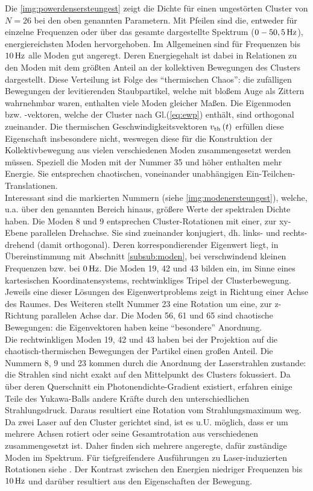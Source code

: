           Die \autoref{img:powerdensersteungest} zeigt die Dichte für einen ungestörten Cluster von $N=26$ bei den oben genannten Parametern. Mit Pfeilen sind die, entweder für einzelne Frequenzen oder über das gesamte dargestellte Spektrum ($\unit[0-50,5]{Hz}$), energiereichsten Moden hervorgehoben. Im Allgemeinen sind für Frequenzen bis $\unit[10]{Hz}$ alle Moden gut angeregt. Deren Energiegehalt ist dabei in Relationen zu den Moden mit dem größten Anteil an der kollektiven Bewegungen des Clusters dargestellt. Diese Verteilung ist Folge des "`thermischen Chaos"': die zufälligen  Bewegungen der levitierenden Staubpartikel, welche mit bloßem Auge als Zittern wahrnehmbar waren, enthalten viele Moden gleicher Maßen. Die Eigenmoden bzw. -vektoren, welche der Cluster nach Gl.(\ref{eq:ewp}) enthält, sind orthogonal zueinander. Die  thermischen Geschwindigkeitsvektoren $v_\text{th}\left(t\right)$ erfüllen diese Eigenschaft insbesondere nicht, weswegen diese für die Konstruktion der Kollektivbewegung aus vielen verschiedenen Moden zusammengesetzt werden müssen. Speziell die Moden mit der Nummer 35 und höher enthalten mehr Energie. Sie entsprechen chaotischen, voneinander unabhängigen Ein-Teilchen-Translationen.\\
          Interessant sind die markierten Nummern (siehe \autoref{img:modenersteungest}), welche, u.a. über den genannten Bereich hinaus, größere Werte der spektralen Dichte haben. Die Moden 8 und 9 entsprechen Cluster-Rotationen mit einer, zur xy-Ebene parallelen  Drehachse. Sie sind zueinander konjugiert, dh. links- und rechts-drehend (damit orthogonal). Deren korrespondierender Eigenwert liegt, in Übereinstimmung mit Abschnitt \ref{subsub:moden}, bei verschwindend kleinen Frequenzen bzw. bei $\unit[0]{Hz}$. Die Moden 19, 42 und 43 bilden ein, im Sinne eines kartesischen Koordinatensystems, rechtwinkliges Tripel der Clusterbewegung. Jeweils eine dieser Lösungen des Eigenwertproblems zeigt in Richtung einer Achse des Raumes. Des Weiteren stellt Nummer 23 eine Rotation um eine, zur z-Richtung parallelen Achse dar. Die Moden 56, 61 und 65 sind chaotische Bewegungen: die Eigenvektoren haben keine "`besondere"' Anordnung.\\
          Die rechtwinkligen Moden 19, 42 und 43 haben bei der Projektion auf die chaotisch-thermischen Bewegungen der Partikel einen großen Anteil. Die Nummern 8, 9 und 23 kommen durch die Anordnung der Laserstrahlen zustande: die Strahlen sind nicht exakt auf den Mittelpunkt des Clusters fokussiert. Da über deren Querschnitt ein Photonendichte-Gradient existiert, erfahren einige Teile des Yukawa-Balls andere Kräfte durch den unterschiedlichen Strahlungsdruck. Daraus resultiert eine Rotation vom Strahlungsmaximum weg. Da zwei Laser auf den Cluster gerichtet sind, ist es u.U. möglich, dass er um mehrere Achsen rotiert oder seine Gesamtrotation aus verschiedenen zusammengesetzt ist. Daher finden sich mehrere angeregte, dafür zuständige Moden im Spektrum. Für tiefgreifendere Ausführungen zu Laser-induzierten Rotationen siehe \cite{Mulsow13}. Der Kontrast zwischen den Energien niedriger Frequenzen bis $\unit[10]{Hz}$ und darüber resultiert aus den Eigenschaften der  Bewegung.

